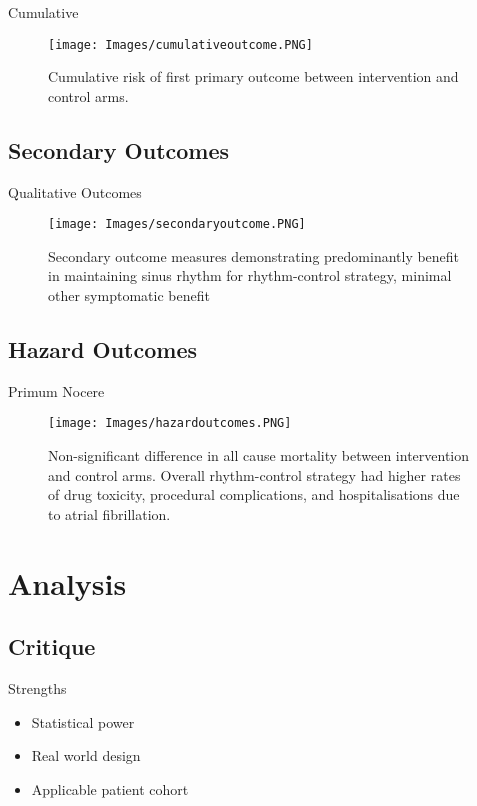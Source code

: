 \documentclass[UKenglish]{beamer}
\begin{document}
\begin{frame}{Cumulative}
    \begin{figure}
        \texttt{[image: Images/cumulativeoutcome.PNG]}
        \caption{Cumulative risk of first primary outcome between intervention and control arms.}
    \end{figure}
    
    
\end{frame}

\subsection{Secondary Outcomes}
\begin{frame}{Qualitative Outcomes}
    \begin{figure}
        \centering
        \texttt{[image: Images/secondaryoutcome.PNG]}
        \caption{Secondary outcome measures demonstrating predominantly benefit in maintaining sinus rhythm for rhythm-control strategy, minimal other symptomatic benefit}
    \end{figure}
\end{frame}

\subsection{Hazard Outcomes}
\begin{frame}{Primum Nocere}
    \begin{figure}
        \centering
        \texttt{[image: Images/hazardoutcomes.PNG]}
        \caption{Non-significant difference in all cause mortality between intervention and control arms. Overall rhythm-control strategy had higher rates of drug toxicity, procedural complications, and hospitalisations due to atrial fibrillation.}
    \end{figure}

\end{frame}

\section{Analysis}
\subsection{Critique}

\begin{frame}{Strengths}
    \begin{itemize}
        \item Statistical power
        \item Real world design
        \item Applicable patient cohort
    \end{itemize}
\end{frame}
\end{document}
